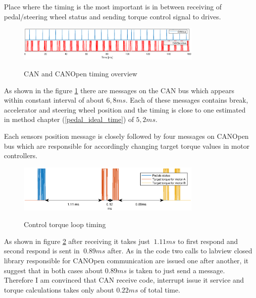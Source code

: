 Place where the timing is the most important is in between receiving of pedal/steering wheel status and sending torque control signal to drives.
\begin{figure}[h]
    \centering
            \includegraphics[width=0.8\textwidth]{figures/perf_rep.eps}
            \label{perf_over}
            \caption{CAN and CANOpen timing overview}
\end{figure}

As shown in the figure \ref{perf_over} there are messages on the CAN bus which appears within constant interval of about $6,8 ms$. Each of these messages contains break, accelerator and steering wheel position and the timing is close to one estimated in method chapter (\ref{pedal_ideal_time}) of $5,2 ms$.

Each sensors position message is closely followed by four messages on CANOpen bus which are responsible for accordingly changing target torque values in motor controllers. 
\begin{figure}[h]
    \centering
            \includegraphics[width=0.8\textwidth]{figures/perf.eps}
            \label{perf}
            \caption{Control torque loop timing}
\end{figure}
As shown in figure \ref{perf} after receiving it takes just $~1.11 ms$ to first respond and second respond is sent in $~0.89 ms$ after. As in the code two calls to labview closed library responsible for CANOpen communication are issued one after another, it suggest that in both cases about $0.89 ms$ is taken to just send a message. Therefore I am convinced that CAN receive code, interrupt issue it service and torque calculations takes only about $0.22 ms$ of total time.